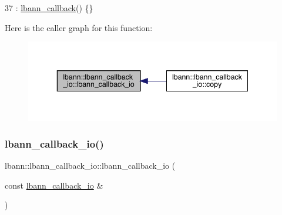 \begin{DoxyCode}
37 : \hyperlink{classlbann_1_1lbann__callback_a679057298a41ddd47f08c157f756c584}{lbann\_callback}() \{\}
\end{DoxyCode}
Here is the caller graph for this function\+:\nopagebreak
\begin{figure}[H]
\begin{center}
\leavevmode
\includegraphics[width=343pt]{classlbann_1_1lbann__callback__io_a12c89d246c657ca588d3fb637ef79183_icgraph}
\end{center}
\end{figure}
\mbox{\label{classlbann_1_1lbann__callback__io_adb2d632c4eeb5585d9b8c7535bd35227}} 
\subsubsection{\texorpdfstring{lbann\+\_\+callback\+\_\+io()}{lbann\_callback\_io()}\hspace{0.1cm}{\footnotesize\ttfamily [2/3]}}
{\footnotesize\ttfamily lbann\+::lbann\+\_\+callback\+\_\+io\+::lbann\+\_\+callback\+\_\+io (\begin{DoxyParamCaption}\item[{const \hyperlink{classlbann_1_1lbann__callback__io}{lbann\+\_\+callback\+\_\+io} \&}]{ }\end{DoxyParamCaption})\hspace{0.3cm}{\ttfamily [default]}}

\mbox{\label{classlbann_1_1lbann__callback__io_a6d19611c89d1cb1bb83f5e4b7a9d5a45}} 
